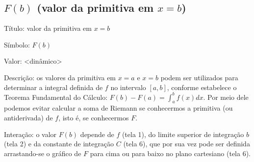 \documentclass[a4paper,10pt]{scrartcl}
\begin{document}
  
  
  \subsection*{$F(b)$ (valor da primitiva em $x=b$)}
    \begin{compactdesc}
	\item{Título:} valor da primitiva em $x = b$
	\item{Símbolo:} $F(b)$
	\item{Valor:} <dinâmico>
	\item{Descrição:} os valores da primitiva em $x = a$ e $x = b$ podem ser utilizados para determinar a integral definida de $f$ no intervalo $[a,b]$, conforme estabelece o Teorema Fundamental do Cálculo: $F(b)-F(a) = \int_a^b f(x) dx$. Por meio dele podemos evitar calcular a soma de Riemann se conhecermos a primitiva (ou antiderivada) de $f$, isto é, se conhecermos $F$.
	\item{Interação:} o valor $F(b)$ depende de $f$ (tela 1), do limite superior de integração $b$ (tela 2) e da constante de integração $C$ (tela 6), que por sua vez pode ser definida arrastando-se o gráfico de $F$ para cima ou para baixo no plano cartesiano (tela 6).
    \end{compactdesc}
    
\end{document}
